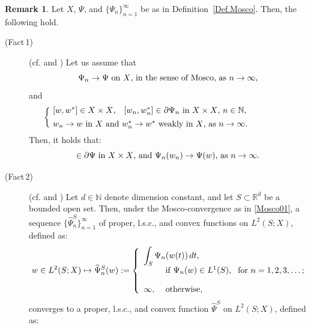 \documentclass{sinst}
\numberwithin{equation}{section}
\theoremstyle{plain}
\theoremstyle{definition}
\newtheorem{rem}{Remark}
\def\N{\mathbb{N}}
\def\R{\mathbb{R}}
\def\ds{\displaystyle}
\begin{document}
  \begin{rem}\label{Rem.MG}
    Let $ X $, $ \Psi $, and $ \{ \Psi_n \}_{n = 1}^\infty $ be as in Definition~\ref{Def.Mosco}. Then, the following hold.
    \begin{description}
      \item[(\hypertarget{Fact1}{Fact\,1})](cf. \cite[Theorem 3.66]{MR0773850} and \cite[Chapter 2]{Kenmochi81}) Let us assume that
      \begin{equation}\label{Mosco01}
        \Psi_n \to \Psi \mbox{ on $ X $, in the sense of  Mosco, as $ n \to \infty $,}
        \vspace{-1ex}
      \end{equation}
  and
  \begin{equation*}
  \left\{ ~ \parbox{10cm}{
  $ [w, w^*] \in X \times X $, ~ $ [w_n, w_n^*] \in \partial \Psi_n $ in $ X \times X $, $ n \in \N $,
  \\[1ex]
  $ w_n \to w $ in $ X $ and $ w_n^* \to w^* $ weakly in $ X $, as $ n \to \infty $.
  } \right.
  \end{equation*}
  Then, it holds that:
  \begin{equation*}
  [w, w^*] \in \partial \Psi \mbox{ in $ X \times X $, and } \Psi_n(w_n) \to \Psi(w) \mbox{, as $ n \to \infty $.}
  \end{equation*}
      \item[(\hypertarget{Fact2}{Fact\,2})](cf. \cite[Lemma 4.1]{MR3661429} and \cite[Appendix]{MR2096945}) Let $ d \in \mathbb{N} $ denote dimension constant, and let $  S \subset \R^d $ be a bounded open set. Then, under the Mosco-convergence as in \eqref{Mosco01}, a sequence $ \{ \widehat{\Psi}_n^S \}_{n = 1}^\infty $ of proper, l.s.c., and convex functions on $ L^2(S; X) $, defined as:
          \begin{equation*}
              w \in L^2(S; X) \mapsto \widehat{\Psi}_n^S(w) := \left\{ \begin{array}{ll}
                      \multicolumn{2}{l}{\ds \int_S \Psi_n(w(t)) \, dt,}
                      \\[1ex]
                      & \mbox{ if $ \Psi_n(w) \in L^1(S) $,}
                      \\[2.5ex]
                      \infty, & \mbox{ otherwise,}
                  \end{array} \right. \mbox{for $ n = 1, 2, 3, \dots $;}
          \end{equation*}
          converges to a proper, l.s.c., and convex function $ \widehat{\Psi}^S $ on $ L^2(S; X) $, defined as:

\end{description}
\end{rem}
\end{document}
